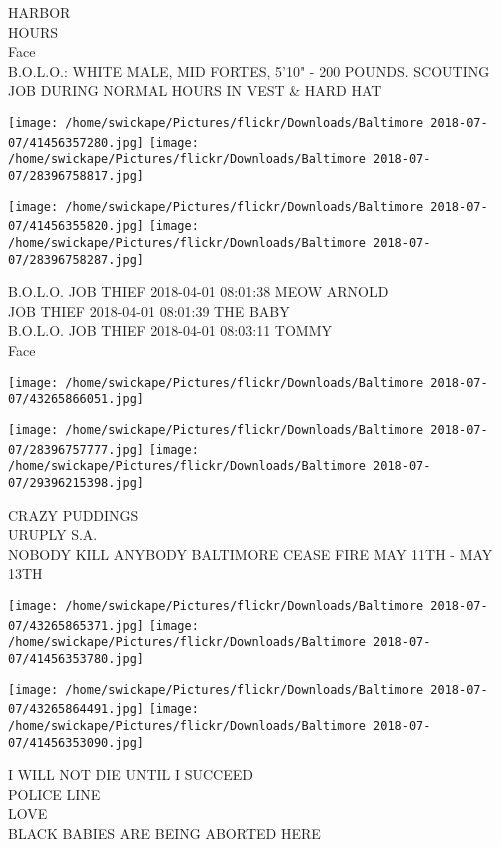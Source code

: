 \documentclass[10pt,letterpaper]{article}
\begin{document}
HARBOR\\
HOURS\\
Face\\
B.O.L.O.: WHITE MALE, MID FORTES, 5'10" {-} 200 POUNDS.  SCOUTING JOB DURING NORMAL HOURS IN VEST \& HARD HAT
\pagebreak

\texttt{[image: /home/swickape/Pictures/flickr/Downloads/Baltimore 2018-07-07/41456357280.jpg]}
\texttt{[image: /home/swickape/Pictures/flickr/Downloads/Baltimore 2018-07-07/28396758817.jpg]}

\texttt{[image: /home/swickape/Pictures/flickr/Downloads/Baltimore 2018-07-07/41456355820.jpg]}
\texttt{[image: /home/swickape/Pictures/flickr/Downloads/Baltimore 2018-07-07/28396758287.jpg]}

B.O.L.O. JOB THIEF 2018{-}04{-}01 08:01:38 MEOW ARNOLD\\
JOB THIEF 2018{-}04{-}01 08:01:39 THE BABY\\
B.O.L.O. JOB THIEF 2018{-}04{-}01 08:03:11 TOMMY\\
Face
\pagebreak

\texttt{[image: /home/swickape/Pictures/flickr/Downloads/Baltimore 2018-07-07/43265866051.jpg]}

\vspace{0.25in}
\texttt{[image: /home/swickape/Pictures/flickr/Downloads/Baltimore 2018-07-07/28396757777.jpg]}
\texttt{[image: /home/swickape/Pictures/flickr/Downloads/Baltimore 2018-07-07/29396215398.jpg]}

CRAZY PUDDINGS\\
URUPLY S.A.\\
NOBODY KILL ANYBODY BALTIMORE CEASE FIRE MAY 11TH {-} MAY 13TH
\pagebreak

\texttt{[image: /home/swickape/Pictures/flickr/Downloads/Baltimore 2018-07-07/43265865371.jpg]}
\texttt{[image: /home/swickape/Pictures/flickr/Downloads/Baltimore 2018-07-07/41456353780.jpg]}

\texttt{[image: /home/swickape/Pictures/flickr/Downloads/Baltimore 2018-07-07/43265864491.jpg]}
\texttt{[image: /home/swickape/Pictures/flickr/Downloads/Baltimore 2018-07-07/41456353090.jpg]}

I WILL NOT DIE UNTIL I SUCCEED\\
POLICE LINE\\
LOVE\\
BLACK BABIES ARE BEING ABORTED HERE
\pagebreak
\end{document}

